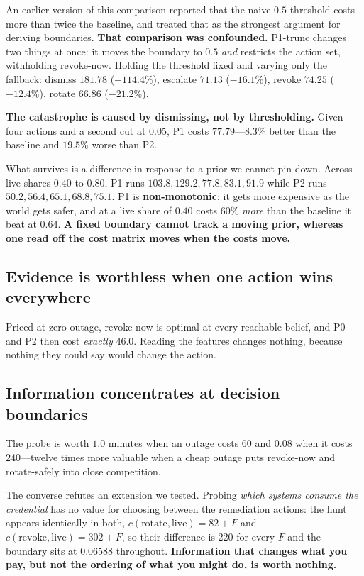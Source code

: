 \documentclass{article}
\begin{document}
An earlier version of this comparison reported that the naive $0.5$ threshold
costs more than twice the baseline, and treated that as the strongest argument
for deriving boundaries. \textbf{That comparison was confounded.} P1-trunc
changes two things at once: it moves the boundary to $0.5$ \emph{and} restricts
the action set, withholding revoke-now. Holding the threshold fixed and varying
only the fallback: dismiss $181.78$ ($+114.4\%$), escalate $71.13$ ($-16.1\%$),
revoke $74.25$ ($-12.4\%$), rotate $66.86$ ($-21.2\%$).

\textbf{The catastrophe is caused by dismissing, not by thresholding.} Given
four actions and a second cut at $0.05$, P1 costs $77.79$---$8.3\%$ better than
the baseline and $19.5\%$ worse than P2.

What survives is a difference in response to a prior we cannot pin down. Across
live shares $0.40$ to $0.80$, P1 runs $103.8, 129.2, 77.8, 83.1, 91.9$ while P2
runs $50.2, 56.4, 65.1, 68.8, 75.1$. P1 is \textbf{non-monotonic}: it gets more
expensive as the world gets safer, and at a live share of $0.40$ costs $60\%$
\emph{more} than the baseline it beat at $0.64$. \textbf{A fixed boundary cannot
track a moving prior, whereas one read off the cost matrix moves when the costs
move.}

\subsection{Evidence is worthless when one action wins everywhere}

Priced at zero outage, revoke-now is optimal at every reachable belief, and P0
and P2 then cost \emph{exactly} $46.0$. Reading the features changes nothing,
because nothing they could say would change the action.

\subsection{Information concentrates at decision boundaries}

The probe is worth $1.0$ minutes when an outage costs 60 and $0.08$ when it
costs 240---twelve times more valuable when a cheap outage puts revoke-now and
rotate-safely into close competition.

The converse refutes an extension we tested. Probing \emph{which systems consume
the credential} has no value for choosing between the remediation actions: the
hunt appears identically in both, $c(\text{rotate},\text{live}) = 82+F$ and
$c(\text{revoke},\text{live}) = 302+F$, so their difference is 220 for every $F$
and the boundary sits at $0.06588$ throughout. \textbf{Information that changes
what you pay, but not the ordering of what you might do, is worth nothing.}
\end{document}
